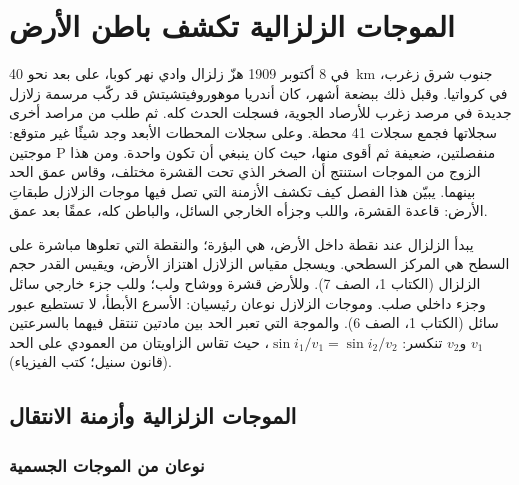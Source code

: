 \chapter{الموجات الزلزالية تكشف باطن الأرض}\label{ch:g11:seismic-structure}

في 8 أكتوبر 1909 هزّ زلزال وادي نهر كوبا، على بعد نحو
\qty{40}{km} جنوب شرق زغرب، في كرواتيا. وقبل ذلك ببضعة أشهر، كان أندريا
موهوروفيتشيتش قد ركّب مرسمة زلازل جديدة في مرصد زغرب
للأرصاد الجوية، فسجلت الحدث كله. ثم طلب من مراصد أخرى
سجلاتها فجمع سجلات 41 محطة. وعلى
سجلات المحطات الأبعد وجد شيئًا غير متوقع: موجتين P
منفصلتين، ضعيفة ثم أقوى منها، حيث كان ينبغي أن تكون
واحدة. ومن هذا الزوج من الموجات استنتج أن الصخر الذي تحت القشرة
مختلف، وقاس عمق الحد بينهما. يبيّن هذا الفصل
كيف تكشف الأزمنة التي تصل فيها موجات الزلازل طبقاتِ
الأرض: قاعدة القشرة، واللب وجزأه الخارجي السائل، والباطن
كله، عمقًا بعد عمق.

\begin{recall}
يبدأ الزلزال عند نقطة داخل الأرض، هي البؤرة؛ والنقطة التي تعلوها مباشرة
على السطح هي المركز السطحي. ويسجل مقياس الزلازل اهتزاز
الأرض، ويقيس القدر حجم الزلزال (الكتاب 1،
الصف 7). وللأرض قشرة ووشاح ولب؛ وللب جزء خارجي
سائل وجزء داخلي صلب. وموجات الزلازل نوعان رئيسيان:
 الأسرع  الأبطأ،  لا تستطيع عبور سائل
(الكتاب 1، الصف 6). والموجة التي تعبر الحد بين مادتين
تنتقل فيهما بالسرعتين $v_1$ و$v_2$ تنكسر:
$\sin i_1/v_1 = \sin i_2/v_2$، حيث تقاس الزاويتان من
العمودي على الحد (قانون سنيل؛ كتب الفيزياء).
\end{recall}

\section{الموجات الزلزالية وأزمنة الانتقال}

\subsection{نوعان من الموجات الجسمية}

